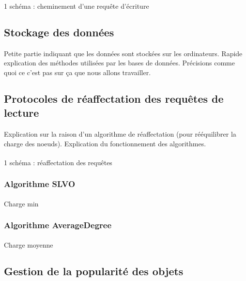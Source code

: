 \documentclass[12pt]{article}
\begin{document}
\paragraph{} 1 schéma : cheminement d'une requête d'écriture

\subsection{Stockage des données}
\paragraph{} Petite partie indiquant que les données sont stockées sur les ordinateurs. Rapide explication des méthodes utilisées par les bases de données. Précisions comme quoi ce c'est pas sur ça que nous allons travailler.

\subsection{Protocoles de réaffectation des requêtes de lecture}
\paragraph{} Explication sur la raison d'un algorithme de réaffectation (pour rééquilibrer la charge des noeuds). Explication du fonctionnement des algorithmes.

\paragraph{} 1 schéma : réaffectation des requêtes

\subsubsection{Algorithme SLVO}
\paragraph{} Charge min
\subsubsection{Algorithme AverageDegree}
\paragraph{} Charge moyenne

\subsection{Gestion de la popularité des objets}
\end{document}
